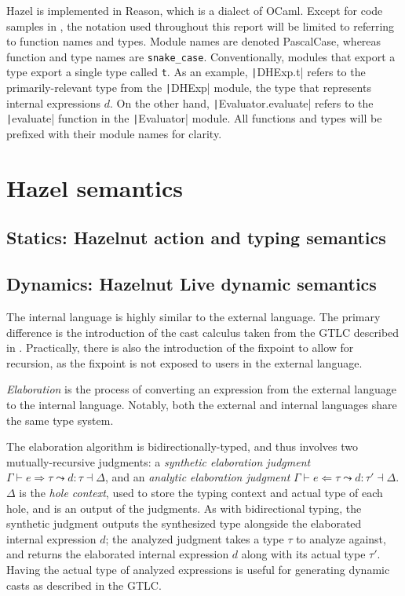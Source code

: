 Hazel is implemented in Reason, which is a dialect of OCaml. Except for code samples in , the notation used throughout this report will be limited to referring to function names and types. Module names are denoted \texttt{}PascalCase, whereas function and type names are \texttt{snake\_case}. Conventionally, modules that export a type export a single type called \texttt{t}. As an example, \texttt|DHExp.t| refers to the primarily-relevant type from the \texttt|DHExp| module, the type that represents internal expressions $d$. On the other hand, \texttt|Evaluator.evaluate| refers to the \texttt|evaluate| function in the \texttt|Evaluator| module. All functions and types will be prefixed with their module names for clarity.

\section{Hazel semantics}
\label{sec:hazel-semantics}

\subsection{Statics: Hazelnut action and typing semantics}
\label{sec:hazel-statics}


\subsection{Dynamics: Hazelnut Live dynamic semantics}
\label{sec:hazel-dynamics}


The internal language is highly similar to the external language. The primary difference is the introduction of the cast calculus taken from the GTLC described in . Practically, there is also the introduction of the fixpoint to allow for recursion, as the fixpoint is not exposed to users in the external language.

\textit{Elaboration} is the process of converting an expression from the external language to the internal language. Notably, both the external and internal languages share the same type system.

The elaboration algorithm is bidirectionally-typed, and thus involves two mutually-recursive judgments: a \textit{synthetic elaboration judgment} $\Gamma\vdash e\Rightarrow\tau\leadsto d:\tau\dashv\Delta$, and an \textit{analytic elaboration judgment} $\Gamma\vdash e\Leftarrow\tau\leadsto d:\tau'\dashv\Delta$. $\Delta$ is the \textit{hole context}, used to store the typing context and actual type of each hole, and is an output of the judgments. As with bidirectional typing, the synthetic judgment outputs the synthesized type alongside the elaborated internal expression $d$; the analyzed judgment takes a type $\tau$ to analyze against, and returns the elaborated internal expression $d$ along with its actual type $\tau'$. Having the actual type of analyzed expressions is useful for generating dynamic casts as described in the GTLC.

